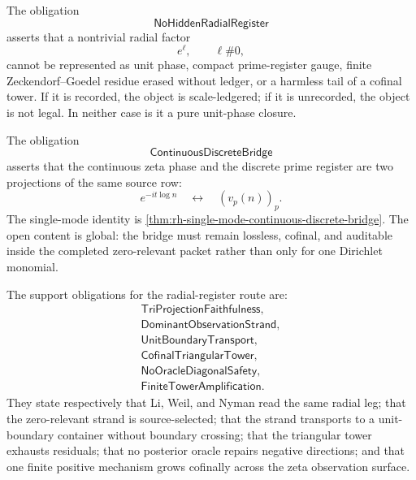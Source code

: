 \begin{definition}[NoHiddenRadialRegister]
\label{def:rh-radial-no-hidden-radial-register}
The obligation
$$
\mathsf{NoHiddenRadialRegister}
$$
asserts that a nontrivial radial factor
$$
e^{\ell},
\qquad
\ell\#0,
$$
cannot be represented as unit phase, compact prime-register gauge,
finite Zeckendorf--Goedel residue erased without ledger, or a harmless
tail of a cofinal tower. If it is recorded, the object is
scale-ledgered; if it is unrecorded, the object is not legal. In neither
case is it a pure unit-phase closure.
\end{definition}

\begin{definition}[ContinuousDiscreteBridge]
\label{def:rh-continuous-discrete-bridge}
The obligation
$$
\mathsf{ContinuousDiscreteBridge}
$$
asserts that the continuous zeta phase and the discrete prime register
are two projections of the same source row:
$$
e^{-it\log n}
\quad\leftrightarrow\quad
(v_p(n))_p.
$$
The single-mode identity is
\autoref{thm:rh-single-mode-continuous-discrete-bridge}. The open
content is global: the bridge must remain lossless, cofinal, and
auditable inside the completed zero-relevant packet rather than only for
one Dirichlet monomial.
\end{definition}

\begin{definition}
\label{def:rh-radial-projection-tower-support-obligations}
The support obligations for the radial-register route are:
$$
\begin{gathered}
\mathsf{TriProjectionFaithfulness},\\
\mathsf{DominantObservationStrand},\\
\mathsf{UnitBoundaryTransport},\\
\mathsf{CofinalTriangularTower},\\
\mathsf{NoOracleDiagonalSafety},\\
\mathsf{FiniteTowerAmplification}.
\end{gathered}
$$
They state respectively that Li, Weil, and Nyman read the same radial
leg; that the zero-relevant strand is source-selected; that the strand
transports to a unit-boundary container without boundary crossing; that
the triangular tower exhausts residuals; that no posterior oracle repairs
negative directions; and that one finite positive mechanism grows
cofinally across the zeta observation surface.
\end{definition}


